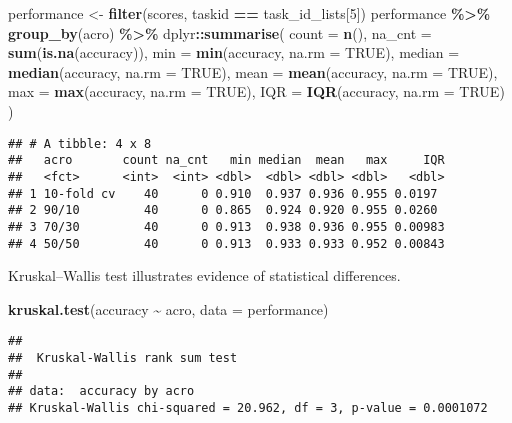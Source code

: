 \documentclass[
]{book}
\newenvironment{Shaded}{\begin{snugshade}}{\end{snugshade}}
\newcommand{\AttributeTok}[1]{\textcolor[rgb]{0.13,0.29,0.53}{#1}}
\newcommand{\ConstantTok}[1]{\textcolor[rgb]{0.56,0.35,0.01}{#1}}
\newcommand{\DecValTok}[1]{\textcolor[rgb]{0.00,0.00,0.81}{#1}}
\newcommand{\FunctionTok}[1]{\textcolor[rgb]{0.13,0.29,0.53}{\textbf{#1}}}
\newcommand{\NormalTok}[1]{#1}
\newcommand{\OtherTok}[1]{\textcolor[rgb]{0.56,0.35,0.01}{#1}}
\newcommand{\SpecialCharTok}[1]{\textcolor[rgb]{0.81,0.36,0.00}{\textbf{#1}}}
\begin{document}
\begin{Shaded}
\begin{Highlighting}[]
\NormalTok{performance }\OtherTok{\textless{}{-}} \FunctionTok{filter}\NormalTok{(scores, taskid }\SpecialCharTok{==}\NormalTok{ task\_id\_lists[}\DecValTok{5}\NormalTok{])}
\NormalTok{performance }\SpecialCharTok{\%\textgreater{}\%}
  \FunctionTok{group\_by}\NormalTok{(acro) }\SpecialCharTok{\%\textgreater{}\%}
\NormalTok{  dplyr}\SpecialCharTok{::}\FunctionTok{summarise}\NormalTok{(}
    \AttributeTok{count =} \FunctionTok{n}\NormalTok{(),}
    \AttributeTok{na\_cnt =} \FunctionTok{sum}\NormalTok{(}\FunctionTok{is.na}\NormalTok{(accuracy)),}
    \AttributeTok{min =} \FunctionTok{min}\NormalTok{(accuracy, }\AttributeTok{na.rm =} \ConstantTok{TRUE}\NormalTok{),}
    \AttributeTok{median =} \FunctionTok{median}\NormalTok{(accuracy, }\AttributeTok{na.rm =} \ConstantTok{TRUE}\NormalTok{),}
    \AttributeTok{mean =} \FunctionTok{mean}\NormalTok{(accuracy, }\AttributeTok{na.rm =} \ConstantTok{TRUE}\NormalTok{),}
    \AttributeTok{max =} \FunctionTok{max}\NormalTok{(accuracy, }\AttributeTok{na.rm =} \ConstantTok{TRUE}\NormalTok{),}
    \AttributeTok{IQR =} \FunctionTok{IQR}\NormalTok{(accuracy, }\AttributeTok{na.rm =} \ConstantTok{TRUE}\NormalTok{)}
\NormalTok{  )}
\end{Highlighting}
\end{Shaded}

\begin{verbatim}
## # A tibble: 4 x 8
##   acro       count na_cnt   min median  mean   max     IQR
##   <fct>      <int>  <int> <dbl>  <dbl> <dbl> <dbl>   <dbl>
## 1 10-fold cv    40      0 0.910  0.937 0.936 0.955 0.0197 
## 2 90/10         40      0 0.865  0.924 0.920 0.955 0.0260 
## 3 70/30         40      0 0.913  0.938 0.936 0.955 0.00983
## 4 50/50         40      0 0.913  0.933 0.933 0.952 0.00843
\end{verbatim}

Kruskal--Wallis test illustrates evidence of statistical differences.

\begin{Shaded}
\begin{Highlighting}[]
\FunctionTok{kruskal.test}\NormalTok{(accuracy }\SpecialCharTok{\textasciitilde{}}\NormalTok{ acro, }\AttributeTok{data =}\NormalTok{ performance)}
\end{Highlighting}
\end{Shaded}

\begin{verbatim}
## 
##  Kruskal-Wallis rank sum test
## 
## data:  accuracy by acro
## Kruskal-Wallis chi-squared = 20.962, df = 3, p-value = 0.0001072
\end{verbatim}
\end{document}
